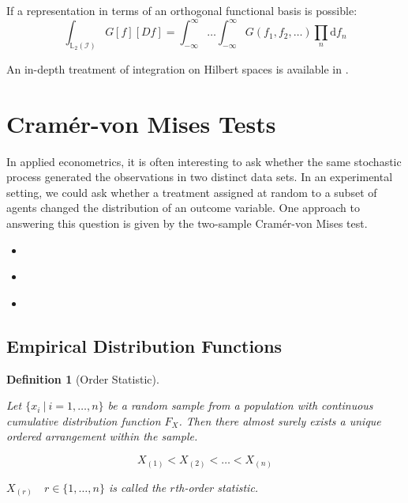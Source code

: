 \documentclass[12pt, a4paper]{article}
\theoremstyle{MAstyle} \newtheorem{assumption}{Assumption}[section]
\theoremstyle{MAstyle} \newtheorem{definition}{Definition}[section]
\begin{document}
			If a representation in terms of an orthogonal functional basis is possible:
			\begin{equation}
				\int_{\mathbb{L}_2(\mathcal{I})} G\left[f\right] \left[Df\right] = \int_{-\infty}^{\infty}\dots\int_{-\infty}^{\infty} G\left(f_1, f_2, \dots\right) \prod_{n} \mathrm{d}f_n
			\end{equation}
		
			An in-depth treatment of integration on Hilbert spaces is available in \cite{skorohod_integration_1974}.
		
	\section{Cram\'{e}r-von Mises Tests}\label{CvM_Tests}
		In applied econometrics, it is often interesting to ask whether the same stochastic process generated the observations in two distinct data sets. In an experimental setting, we could ask whether a treatment assigned at random to a subset of agents changed the distribution of an outcome variable. 
		One approach to answering this question is given by the two-sample Cram\'{e}r-von Mises test.
		
		\begin{itemize}
			\item \cite{darling_kolmogorov-smirnov_1957}
			\item \cite{anderson_asymptotic_1952}
			\item \cite{buning_nichtparametrische_2013}
		\end{itemize}
	
		\subsection{Empirical Distribution Functions}
			
			\cite{gibbons_nonparametric_2021}
			\begin{definition}[Order Statistic]\label{Order_Stat}
				
				Let $\{x_i \: \vert \: i = 1, \dots , n\}$ be a random sample from a population with continuous cumulative distribution function $F_X$. Then there almost surely exists a unique ordered arrangement within the sample. 
				
				$$X_{(1)} < X_{(2)} < \dots < X_{(n)}$$
				
				$X_{(r)} \quad r \in \{1, \dots, n\}$ is called the $r$th-order statistic.	
			\end{definition}
		
\end{document}
